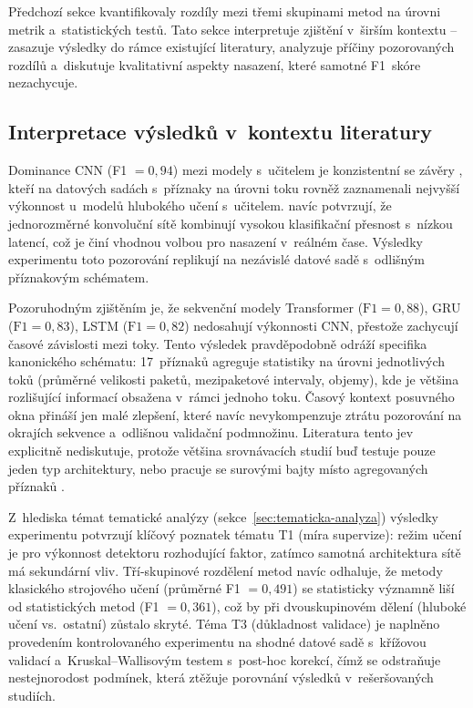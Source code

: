 Předchozí sekce kvantifikovaly rozdíly mezi třemi skupinami metod na úrovni metrik a~statistických testů. Tato sekce interpretuje zjištění v~širším kontextu -- zasazuje výsledky do rámce existující literatury, analyzuje příčiny pozorovaných rozdílů a~diskutuje kvalitativní aspekty nasazení, které samotné F1~skóre nezachycuje.

\subsection{Interpretace výsledků v~kontextu literatury}
\label{sec:diskuse-literatura}

Dominance CNN (F1 $= 0{,}94$) mezi modely s~učitelem je konzistentní se závěry \textcite{Barut2020}, kteří na datových sadách s~příznaky na úrovni toku rovněž zaznamenali nejvyšší výkonnost u~modelů hlubokého učení s~učitelem. \textcite{Bakhshi2021} navíc potvrzují, že jednorozměrné konvoluční sítě kombinují vysokou klasifikační přesnost s~nízkou latencí, což je činí vhodnou volbou pro nasazení v~reálném čase. Výsledky experimentu toto pozorování replikují na nezávislé datové sadě s~odlišným příznakovým schématem.

Pozoruhodným zjištěním je, že sekvenční modely Transformer ($\text{F1} = 0{,}88$), GRU ($\text{F1} = 0{,}83$), LSTM ($\text{F1} = 0{,}82$) nedosahují výkonnosti CNN, přestože zachycují časové závislosti mezi toky. Tento výsledek pravděpodobně odráží specifika kanonického schématu: 17~příznaků agreguje statistiky na úrovni jednotlivých toků (průměrné velikosti paketů, mezipaketové intervaly, objemy), kde je většina rozlišující informací obsažena v~rámci jednoho toku. Časový kontext posuvného okna přináší jen malé zlepšení, které navíc nevykompenzuje ztrátu pozorování na okrajích sekvence a~odlišnou validační podmnožinu. Literatura tento jev explicitně nediskutuje, protože většina srovnávacích studií buď testuje pouze jeden typ architektury, nebo pracuje se surovými bajty místo agregovaných příznaků \parencite{Ji2024}.

Z~hlediska témat tematické analýzy (sekce~\ref{sec:tematicka-analyza}) výsledky experimentu potvrzují klíčový poznatek tématu T1 (míra supervize): režim učení je pro výkonnost detektoru rozhodující faktor, zatímco samotná architektura sítě má sekundární vliv. Tří-skupinové rozdělení metod navíc odhaluje, že metody klasického strojového učení (průměrné F1 $= 0{,}491$) se statisticky významně liší od statistických metod (F1 $= 0{,}361$), což by při dvouskupinovém dělení (hluboké učení vs.~ostatní) zůstalo skryté. Téma T3 (důkladnost validace) je naplněno provedením kontrolovaného experimentu na shodné datové sadě s~křížovou validací a~Kruskal--Wallisovým testem s~post-hoc korekcí, čímž se odstraňuje nestejnorodost podmínek, která ztěžuje porovnání výsledků v~rešeršovaných studiích.


